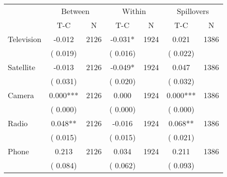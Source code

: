 
\begin{tabular}{l*{6}{c}}\hline&\multicolumn{2}{c}{Between}&\multicolumn{2}{c}{Within}&\multicolumn{2}{c}{Spillovers} \\ \cmidrule(r){2-3}\cmidrule(l){4-5}\cmidrule(l){6-7} & {T-C} & {N} & {T-C} & {N}  & {T-C}  & {N}  \\ \midrule
Television        &             -0.012      &       2126       &             -0.031*      &       1924       &              0.021      &       1386       \\
                       &       (       0.019)            &                               &       (       0.016)            &                               &       (       0.022)            &                               \\
Satellite        &             -0.013      &       2126       &             -0.049*      &       1924       &              0.047      &       1386       \\
                       &       (       0.031)            &                               &       (       0.020)            &                               &       (       0.032)            &                               \\
Camera        &              0.000***      &       2126       &              0.000      &       1924       &              0.000***      &       1386       \\
                       &       (       0.000)            &                               &       (       0.000)            &                               &       (       0.000)            &                               \\
Radio        &              0.048**      &       2126       &             -0.016      &       1924       &              0.068**      &       1386       \\
                       &       (       0.015)            &                               &       (       0.015)            &                               &       (       0.021)            &                               \\
Phone        &              0.213      &       2126       &              0.034      &       1924       &              0.211      &       1386       \\
                       &       (       0.084)            &                               &       (       0.062)            &                               &       (       0.093)            &                               \\
\hline \end{tabular}